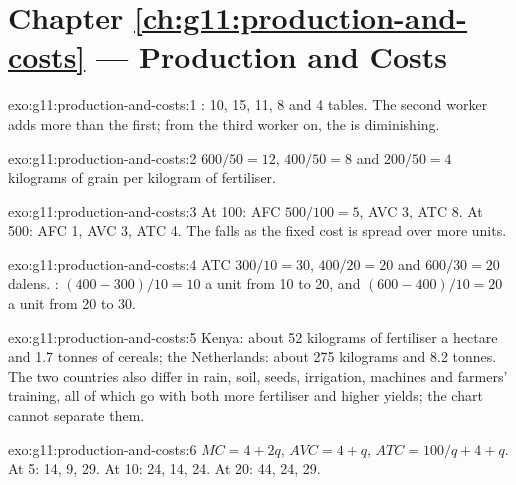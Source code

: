 \section*{Chapter \ref{ch:g11:production-and-costs} --- Production and Costs}

\begin{solution}{exo:g11:production-and-costs:1}
: 10, 15, 11, 8 and 4 tables. The second worker adds more than the first; from the third worker on, the  is diminishing.
\end{solution}

\begin{solution}{exo:g11:production-and-costs:2}
$600/50 = 12$, $400/50 = 8$ and $200/50 = 4$ kilograms of grain per kilogram of fertiliser.
\end{solution}

\begin{solution}{exo:g11:production-and-costs:3}
At 100: AFC $500/100 = 5$, AVC 3, ATC 8. At 500: AFC 1, AVC 3, ATC 4. The  falls as the fixed cost is spread over more units.
\end{solution}

\begin{solution}{exo:g11:production-and-costs:4}
ATC $300/10 = 30$, $400/20 = 20$ and $600/30 = 20$ dalens. : $(400 - 300)/10 = 10$ a unit from 10 to 20, and $(600 - 400)/10 = 20$ a unit from 20 to 30.
\end{solution}

\begin{solution}{exo:g11:production-and-costs:5}
Kenya: about 52 kilograms of fertiliser a hectare and 1.7 tonnes of cereals; the Netherlands: about 275 kilograms and 8.2 tonnes. The two countries also differ in
rain, soil, seeds, irrigation, machines and farmers' training, all of which go with both more fertiliser and higher yields; the chart cannot separate them.
\end{solution}

\begin{solution}{exo:g11:production-and-costs:6}
$\mathit{MC} = 4 + 2q$, $\mathit{AVC} = 4 + q$, $\mathit{ATC} = 100/q + 4 + q$. At 5: 14, 9, 29. At 10: 24, 14, 24. At 20: 44, 24, 29.
\end{solution}

